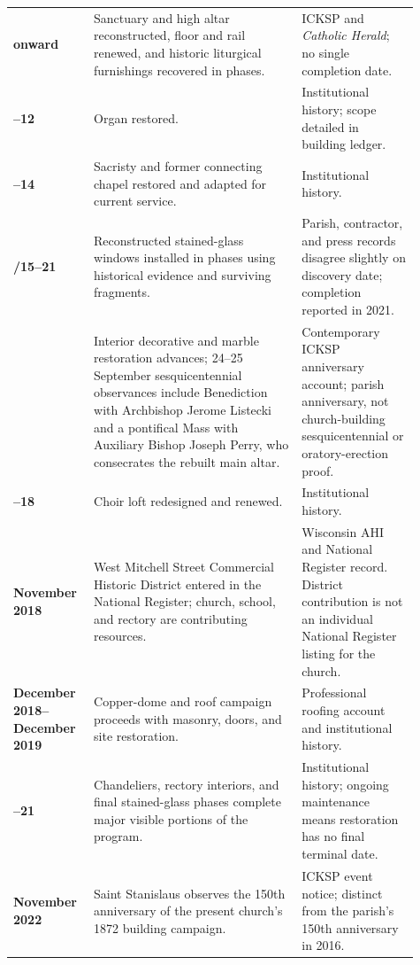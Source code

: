 \begin{longtable}{>{\bfseries\RaggedRight\arraybackslash}p{0.16\linewidth}>{\RaggedRight\arraybackslash}p{0.48\linewidth}>{\RaggedRight\arraybackslash}p{0.27\linewidth}}
2008 onward & Sanctuary and high altar reconstructed, floor and rail renewed, and historic liturgical furnishings recovered in phases. & ICKSP and \emph{Catholic Herald}; no single completion date.\\

2011--12 & Organ restored. & Institutional history; scope detailed in building ledger.\\

2013--14 & Sacristy and former connecting chapel restored and adapted for current service. & Institutional history.\\

2014/15--21 & Reconstructed stained-glass windows installed in phases using historical evidence and surviving fragments. & Parish, contractor, and press records disagree slightly on discovery date; completion reported in 2021.\\

2016 & Interior decorative and marble restoration advances; 24--25 September sesquicentennial observances include Benediction with Archbishop Jerome Listecki and a pontifical Mass with Auxiliary Bishop Joseph Perry, who consecrates the rebuilt main altar. & Contemporary ICKSP anniversary account; parish anniversary, not church-building sesquicentennial or oratory-erection proof.\\

2017--18 & Choir loft redesigned and renewed. & Institutional history.\\

9 November 2018 & West Mitchell Street Commercial Historic District entered in the National Register; church, school, and rectory are contributing resources. & Wisconsin AHI and National Register record. District contribution is not an individual National Register listing for the church.\\

December 2018--December 2019 & Copper-dome and roof campaign proceeds with masonry, doors, and site restoration. & Professional roofing account and institutional history.\\

2019--21 & Chandeliers, rectory interiors, and final stained-glass phases complete major visible portions of the program. & Institutional history; ongoing maintenance means restoration has no final terminal date.\\

19 November 2022 & Saint Stanislaus observes the 150th anniversary of the present church's 1872 building campaign. & ICKSP event notice; distinct from the parish's 150th anniversary in 2016.\\


\end{longtable}
